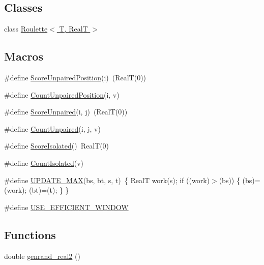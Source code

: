 \subsection*{Classes}
\begin{DoxyCompactItemize}
\item 
class \hyperlink{class_roulette}{Roulette$<$ T, Real\+T $>$}
\end{DoxyCompactItemize}
\subsection*{Macros}
\begin{DoxyCompactItemize}
\item 
\#define \hyperlink{contrafold_2_inference_engine_8ipp_a666eda33d91985654878e47d2ae946f9}{Score\+Unpaired\+Position}(i)~(Real\+T(0))
\item 
\#define \hyperlink{contrafold_2_inference_engine_8ipp_ad1a5e921b0e92db551f427174caf4a17}{Count\+Unpaired\+Position}(i, v)
\item 
\#define \hyperlink{contrafold_2_inference_engine_8ipp_a60bcc697793ce883a656595cf9732373}{Score\+Unpaired}(i, j)~(Real\+T(0))
\item 
\#define \hyperlink{contrafold_2_inference_engine_8ipp_a1056d51ce4855d6c744d64cb4414889e}{Count\+Unpaired}(i, j, v)
\item 
\#define \hyperlink{contrafold_2_inference_engine_8ipp_ac7f880303691dec46142c5aa8ea7a874}{Score\+Isolated}()~Real\+T(0)
\item 
\#define \hyperlink{contrafold_2_inference_engine_8ipp_ac58980ba92ea9f88ce315d81b41b4788}{Count\+Isolated}(v)
\item 
\#define \hyperlink{contrafold_2_inference_engine_8ipp_aa442846731fffbfb508207db22742336}{U\+P\+D\+A\+T\+E\+\_\+\+M\+A\+X}(bs, bt, s, t)~\{ Real\+T work(s); if ((work)$>$(bs)) \{ (bs)=(work); (bt)=(t); \} \}
\item 
\#define \hyperlink{contrafold_2_inference_engine_8ipp_a7e408bb5a1389bf6eeded11b1b863d5d}{U\+S\+E\+\_\+\+E\+F\+F\+I\+C\+I\+E\+N\+T\+\_\+\+W\+I\+N\+D\+O\+W}
\end{DoxyCompactItemize}
\subsection*{Functions}
\begin{DoxyCompactItemize}
\item 
double \hyperlink{contrafold_2_inference_engine_8ipp_aba62640e476eb86ecd383e1519e9b310}{genrand\+\_\+real2} ()
\end{DoxyCompactItemize}


